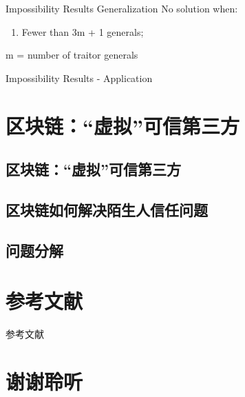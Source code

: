 \documentclass[11pt]{beamer}
\begin{document}
\begin{frame}{Impossibility Results Generalization}
	No solution when:
	\begin{enumerate}
		\item Fewer than 3m + 1 generals;
	\end{enumerate}
m = number of traitor generals
\end{frame}

\begin{frame}{Impossibility Results - Application}
	
\end{frame}






\section{区块链：“虚拟”可信第三方}

\subsection{区块链：“虚拟”可信第三方}

\subsection{区块链如何解决陌生人信任问题}

\subsection{问题分解}

\section*{参考文献}
\begin{frame}{参考文献}
	\printbibliography
\end{frame}

\section*{谢谢聆听}
\end{document}
